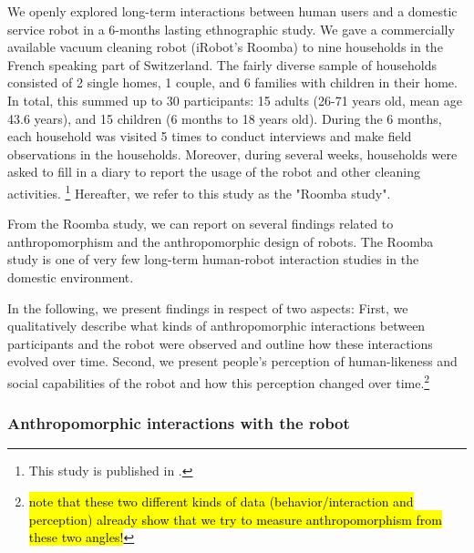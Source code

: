 \documentclass{frontiersSCNS} %
\begin{document}
We openly explored long-term interactions between human users and a domestic service robot in a 6-months lasting ethnographic study. We gave a commercially available vacuum cleaning robot (iRobot's Roomba) to nine households in the French speaking part of Switzerland. The fairly diverse sample of households consisted of 2 single homes, 1 couple, and 6 families with children in their home. In total, this summed up to 30 participants: 15 adults (26-71 years old, mean age 43.6 years), and 15 children (6 months to 18 years old). During the 6 months, each household was visited 5 times to conduct interviews and make field observations in the households. Moreover, during several weeks, households were asked to fill in a diary to report the usage of the robot and other cleaning activities.
\footnote{This study is published in \cite{fink_living_2013}.}
Hereafter, we refer to this study as the "Roomba study".


From the Roomba study, we can report on several findings related to anthropomorphism and the anthropomorphic design of robots.
The Roomba study is one of very few long-term human-robot interaction studies in the domestic environment. 

In the following, we present findings in respect of two aspects:
First, we qualitatively describe what kinds of anthropomorphic interactions between participants and the robot were observed and outline how these interactions evolved over time.
Second, we present people's perception of human-likeness and social capabilities of the robot and how this perception changed over time.\footnote{\hl{note that these two different kinds of data (behavior/interaction and perception) already show that we try to measure anthropomorphism from these two angles!}}

\subsubsection{Anthropomorphic interactions with the robot\\}
\end{document}
